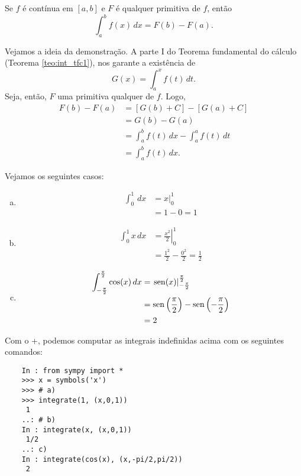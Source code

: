 \begin{teo}\label{teo:int_tfc2}
  Se $f$ é contínua em $[a, b]$ e $F$ é qualquer primitiva de $f$, então
  \begin{equation}
    \int_a^b f(x)\,dx = F(b) - F(a).
  \end{equation}
\end{teo}
\begin{dem}
  Vejamos a ideia da demonstração. A parte I do Teorema fundamental do cálculo (Teorema \ref{teo:int_tfc1}), nos garante a existência de
  \begin{equation}
    G(x) = \int_a^x f(t)\,dt.
  \end{equation}
  Seja, então, $F$ uma primitiva qualquer de $f$. Logo,
  \begin{align}
    F(b) - F(a) &= [G(b) + C] - [G(a) + C] \\
                &= G(b) - G(a) \\
                &= \int_a^b f(t)\,dx - \int_a^a f(t)\,dt \\
                &= \int_a^b f(t)\,dx.
  \end{align}
\end{dem}

\begin{ex}
  Vejamos os seguintes casos:
  \begin{enumerate}[a)]
  \item
    \begin{align}
      \int_0^1 \,dx &= \left. x \right|_0^1 \\
                    &= 1 - 0 = 1
    \end{align}
  \item
    \begin{align}
      \int_0^1 x\,dx &= \left.\frac{x^2}{2}\right|_0^1\\
                     &= \frac{1^2}{2}-\frac{0^2}{2} = \frac{1}{2}
    \end{align}
  \item
    \begin{align}
      \int_{-\frac{\pi}{2}}^{\frac{\pi}{2}} \cos(x)\,dx &= \left.\operatorname{sen}(x)\right|_{-\frac{\pi}{2}}^{\frac{\pi}{2}}\\
                                                        &= \operatorname{sen}\left(\frac{\pi}{2}\right) - \operatorname{sen}\left(-\frac{\pi}{2}\right) \\
                                                        &= 2
    \end{align}
  \end{enumerate}
  \ifispython
  Com o {\python}+{\sympy}, podemos computar as integrais indefinidas acima com os seguintes comandos:
  \begin{lstlisting}
    In : from sympy import *
    >>> x = symbols('x')
    >>> # a)
    >>> integrate(1, (x,0,1))
     1
    ..: # b)
    In : integrate(x, (x,0,1))
     1/2
    ..: c)
    In : integrate(cos(x), (x,-pi/2,pi/2))
     2
  \end{lstlisting}
  \fi  
\end{ex}

